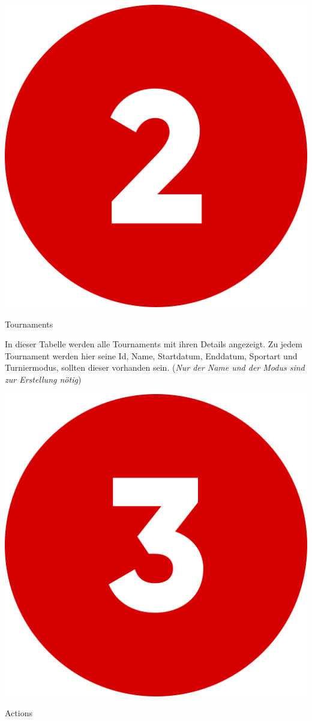 \bigskip
\includegraphics[scale=0.05]{pics/user-guide/numbers/number-2.png} \begin{LARGE} Tournaments \end{LARGE}

In dieser Tabelle werden alle Tournaments mit ihren Details angezeigt. Zu jedem Tournament werden hier seine Id, Name, Startdatum, Enddatum, Sportart
und Turniermodus, sollten dieser vorhanden sein. (\textit{Nur der Name und der Modus sind zur Erstellung nötig})


\bigskip
\includegraphics[scale=0.05]{pics/user-guide/numbers/number-3.png} \begin{LARGE} Actions \end{LARGE}

